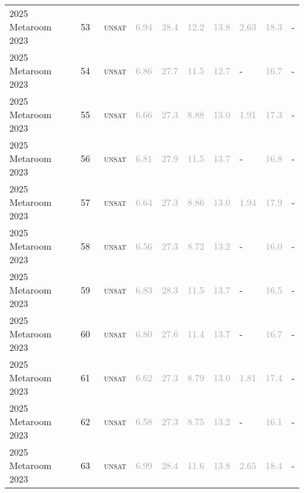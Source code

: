 \begin{center}
{\begin{longtable}{@{}llllllllll@{}}
2025 Metaroom 2023 & 53 & ~\textsc{unsat} & \textcolor{darkgray}{6.94} & \textcolor{darkgray}{28.4} & \textcolor{darkgray}{12.2} & \textcolor{darkgray}{13.8} & \textcolor{darkgray}{2.63} & \textcolor{darkgray}{18.3} & - \\
2025 Metaroom 2023 & 54 & ~\textsc{unsat} & \textcolor{darkgray}{6.86} & \textcolor{darkgray}{27.7} & \textcolor{darkgray}{11.5} & \textcolor{darkgray}{12.7} & - & \textcolor{darkgray}{16.7} & - \\
2025 Metaroom 2023 & 55 & ~\textsc{unsat} & \textcolor{darkgray}{6.66} & \textcolor{darkgray}{27.3} & \textcolor{darkgray}{8.88} & \textcolor{darkgray}{13.0} & \textcolor{darkgray}{1.91} & \textcolor{darkgray}{17.3} & - \\
2025 Metaroom 2023 & 56 & ~\textsc{unsat} & \textcolor{darkgray}{6.81} & \textcolor{darkgray}{27.9} & \textcolor{darkgray}{11.5} & \textcolor{darkgray}{13.7} & - & \textcolor{darkgray}{16.8} & - \\
2025 Metaroom 2023 & 57 & ~\textsc{unsat} & \textcolor{darkgray}{6.64} & \textcolor{darkgray}{27.3} & \textcolor{darkgray}{8.86} & \textcolor{darkgray}{13.0} & \textcolor{darkgray}{1.94} & \textcolor{darkgray}{17.9} & - \\
2025 Metaroom 2023 & 58 & ~\textsc{unsat} & \textcolor{darkgray}{6.56} & \textcolor{darkgray}{27.3} & \textcolor{darkgray}{8.72} & \textcolor{darkgray}{13.2} & - & \textcolor{darkgray}{16.0} & - \\
2025 Metaroom 2023 & 59 & ~\textsc{unsat} & \textcolor{darkgray}{6.83} & \textcolor{darkgray}{28.3} & \textcolor{darkgray}{11.5} & \textcolor{darkgray}{13.7} & - & \textcolor{darkgray}{16.5} & - \\
2025 Metaroom 2023 & 60 & ~\textsc{unsat} & \textcolor{darkgray}{6.80} & \textcolor{darkgray}{27.6} & \textcolor{darkgray}{11.4} & \textcolor{darkgray}{13.7} & - & \textcolor{darkgray}{16.7} & - \\
2025 Metaroom 2023 & 61 & ~\textsc{unsat} & \textcolor{darkgray}{6.62} & \textcolor{darkgray}{27.3} & \textcolor{darkgray}{8.79} & \textcolor{darkgray}{13.0} & \textcolor{darkgray}{1.81} & \textcolor{darkgray}{17.4} & - \\
2025 Metaroom 2023 & 62 & ~\textsc{unsat} & \textcolor{darkgray}{6.58} & \textcolor{darkgray}{27.3} & \textcolor{darkgray}{8.75} & \textcolor{darkgray}{13.2} & - & \textcolor{darkgray}{16.1} & - \\
2025 Metaroom 2023 & 63 & ~\textsc{unsat} & \textcolor{darkgray}{6.99} & \textcolor{darkgray}{28.4} & \textcolor{darkgray}{11.6} & \textcolor{darkgray}{13.8} & \textcolor{darkgray}{2.65} & \textcolor{darkgray}{18.4} & - \\

\end{longtable}}
\end{center}
